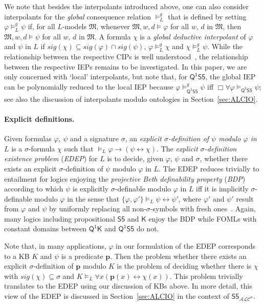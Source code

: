 \documentclass{lmcs} %
\theoremstyle{plain}\newtheorem{satz}[thm]{Satz} %
\newcommand{\sig}{\mathit{sig}}
\newcommand{\SF}{\ensuremath{\mathsf{S5}}}
\newcommand{\FOMK}{\ensuremath{\mathsf{Q^1K}}}
\newcommand{\FOMS}{\ensuremath{\mathsf{Q^1S5}}}
\newcommand{\fform}[1]{\boldsymbol{#1}}
\newcommand{\pvar}{\fform{p}}
\newcommand{\ALCIOS}{\ensuremath{\mathsf{S5}_{\mathcal{ALC}^u}}}
\begin{document}
We note that besides the interpolants introduced above, one can also consider interpolants for the \emph{global} consequence relation $\models_{L}^{g}$ that is defined by setting $\varphi\models_{L}^{g}\psi$ if, for all $L$-models $\mathfrak{M}$, whenever $\mathfrak{M},w,d\models \varphi$ for all $w$, $d$ in $\mathfrak{M}$, then $\mathfrak{M},w,d\models \psi$ for all $w$, $d$ in $\mathfrak{M}$. A formula $\chi$ is a \emph{global deductive interpolant} of $\varphi$ and $\psi$ in $L$ if $\sig(\chi) \subseteq \sig(\varphi) \cap \sig(\psi)$, $\varphi\models_L^{g} \chi$ and $\chi \models_L^{g} \psi$. While the relationship between the respective CIPs is well understood~\cite{chapter:nonclassical}, the relationship between the respective IEPs remains to be investigated. In this paper, we are only concerned with `local' interpolants, but note that, for $\FOMS$, the global IEP can be polynomially reduced to the local IEP because $\varphi\models_{\FOMS}^{g}\psi$ iff $\Box\forall \varphi \models_{\FOMS}\psi$; see also the discussion of interpolants modulo ontologies in Section~\ref{sec:ALCIO}.

\paragraph{Explicit definitions.} Given formulas $\varphi$, $\psi$ and a signature $\sigma$, 
an \emph{explicit $\sigma$-definition of $\psi$ modulo $\varphi$ in $L$} is a $\sigma$-formula $\chi$ such that 
$\models_L\varphi\to(\psi\leftrightarrow\chi)$. 
The \emph{explicit $\sigma$-definition existence problem} (\emph{EDEP}) for $L$ is to decide, given $\varphi$, $\psi$ and $\sigma$, whether there exists an explicit $\sigma$-definition of $\psi$ modulo $\varphi$ in $L$. The 
EDEP reduces trivially to entailment for logics enjoying the \emph{projective Beth definability property} (\emph{BDP})  according to which $\psi$ is explicitly $\sigma$-definable modulo $\varphi$ in $L$ iff it is implicitly $\sigma$-definable modulo $\varphi$ in the sense that $\{\varphi,\varphi'\}\models_{L} \psi \leftrightarrow \psi'$, where $\varphi'$ and $\psi'$ result from $\varphi$ and $\psi$ by uniformly replacing all non-$\sigma$-symbols with fresh ones~\cite{modeltheory}. Again, many logics including propositional $\SF$ and $\mathsf{K}$ enjoy the BDP while FOMLs with constant domains between $\FOMK$ and $\FOMS$ do not. 

Note that, in many applications, $\varphi$ in our formulation of the EDEP corresponds to a KB $K$ and $\psi$ is a predicate $\pvar$. Then the problem whether there exists an explicit $\sigma$-definition of $\pvar$ modulo $K$ is the problem of deciding whether there is $\chi$ with $\sig(\chi) \subseteq \sigma$ and  $K\models_{L}\forall x(\pvar(x) \leftrightarrow \chi(x))$. This problem trivially translates to the EDEP using our discussion of KBs above. In more detail, this view of the EDEP is discussed in Section~\ref{sec:ALCIO} in the context of $\ALCIOS$.
\end{document}
